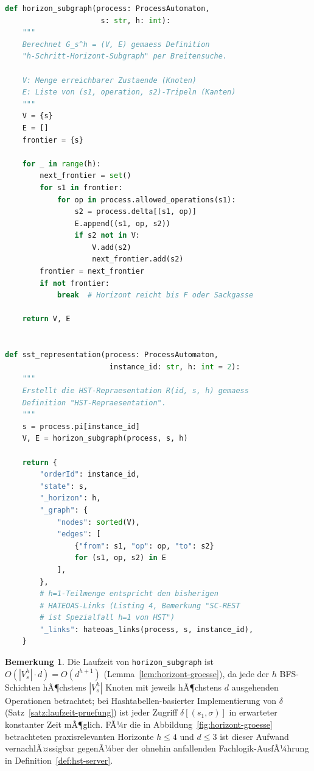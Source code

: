 ﻿\documentclass[a4paper,12pt]{article}
\theoremstyle{definition}
\newtheorem{bemerkung}{Bemerkung}
\begin{document}
\begin{lstlisting}[language=Python, label=lst:hst-bfs, caption=Breitensuchbasierte Berechnung des Horizont-Subgraphen $G_s^h$ und Einbettung in die HST-Repraesentation]
def horizon_subgraph(process: ProcessAutomaton,
                      s: str, h: int):
    """
    Berechnet G_s^h = (V, E) gemaess Definition
    "h-Schritt-Horizont-Subgraph" per Breitensuche.

    V: Menge erreichbarer Zustaende (Knoten)
    E: Liste von (s1, operation, s2)-Tripeln (Kanten)
    """
    V = {s}
    E = []
    frontier = {s}

    for _ in range(h):
        next_frontier = set()
        for s1 in frontier:
            for op in process.allowed_operations(s1):
                s2 = process.delta[(s1, op)]
                E.append((s1, op, s2))
                if s2 not in V:
                    V.add(s2)
                    next_frontier.add(s2)
        frontier = next_frontier
        if not frontier:
            break  # Horizont reicht bis F oder Sackgasse

    return V, E


def sst_representation(process: ProcessAutomaton,
                        instance_id: str, h: int = 2):
    """
    Erstellt die HST-Repraesentation R(id, s, h) gemaess
    Definition "HST-Repraesentation".
    """
    s = process.pi[instance_id]
    V, E = horizon_subgraph(process, s, h)

    return {
        "orderId": instance_id,
        "state": s,
        "_horizon": h,
        "_graph": {
            "nodes": sorted(V),
            "edges": [
                {"from": s1, "op": op, "to": s2}
                for (s1, op, s2) in E
            ],
        },
        # h=1-Teilmenge entspricht den bisherigen
        # HATEOAS-Links (Listing 4, Bemerkung "SC-REST
        # ist Spezialfall h=1 von HST")
        "_links": hateoas_links(process, s, instance_id),
    }
\end{lstlisting}

\begin{bemerkung}
	Die Laufzeit von \texttt{horizon\_subgraph} ist $O(|V_s^h|\cdot d)= O(d^{h+1})$
	(Lemma~\ref{lem:horizont-groesse}), da jede der $h$ BFS-Schichten hÃ¶chstens
	$|V_s^h|$ Knoten mit jeweils hÃ¶chstens $d$ ausgehenden Operationen betrachtet; bei
	Hashtabellen-basierter Implementierung von $\delta$ (Satz~\ref{satz:laufzeit-pruefung})
	ist jeder Zugriff $\delta[(s_1,\sigma)]$ in erwarteter konstanter Zeit mÃ¶glich. FÃ¼r
	die in Abbildung~\ref{fig:horizont-groesse} betrachteten praxisrelevanten Horizonte
	$h\le4$ und $d\le3$ ist dieser Aufwand vernachlÃ¤ssigbar gegenÃ¼ber der ohnehin
	anfallenden Fachlogik-AusfÃ¼hrung in Definition~\ref{def:hst-server}.
\end{bemerkung}
\end{document}

